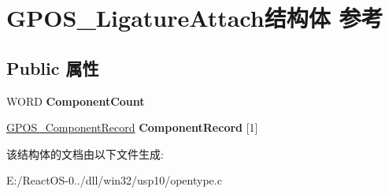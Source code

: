 \hypertarget{struct_g_p_o_s___ligature_attach}{}\section{G\+P\+O\+S\+\_\+\+Ligature\+Attach结构体 参考}
\label{struct_g_p_o_s___ligature_attach}
\subsection*{Public 属性}
\begin{DoxyCompactItemize}
\item 
\mbox{\label{struct_g_p_o_s___ligature_attach_ae5bf1b53ed376ea0a19ce57e0f1f9ea6}} 
W\+O\+RD {\bfseries Component\+Count}
\item 
\mbox{\label{struct_g_p_o_s___ligature_attach_aa524fe83581e287b190b99e195c445b2}} 
\hyperlink{struct_g_p_o_s___component_record}{G\+P\+O\+S\+\_\+\+Component\+Record} {\bfseries Component\+Record} \mbox{[}1\mbox{]}
\end{DoxyCompactItemize}


该结构体的文档由以下文件生成\+:\begin{DoxyCompactItemize}
\item 
E\+:/\+React\+O\+S-\/0../dll/win32/usp10/opentype.\+c\end{DoxyCompactItemize}

